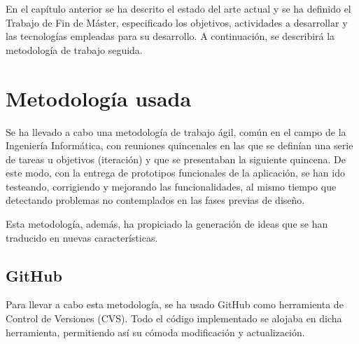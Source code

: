 

En el capítulo anterior se ha descrito el estado del arte actual y se ha definido el Trabajo de Fin de Máster, especificado los objetivos, actividades a desarrollar y las tecnologías empleadas para su desarrollo. A continuación, se describirá la metodología de trabajo seguida.


\section{Metodología usada}
\label{2:sec:1}

Se ha llevado a cabo una metodología de trabajo ágil, común en el campo de la Ingeniería Informática, con reuniones quincenales en las que se definían una serie de tareas u objetivos (iteración) y que se presentaban la siguiente quincena. 
De este modo, con la entrega de prototipos funcionales de la aplicación, se han ido testeando, corrigiendo y mejorando las 
funcionalidades, al mismo tiempo que detectando problemas no contemplados en las fases previas de diseño.

Esta metodología, además, ha propiciado la generación de ideas que se han traducido en nuevas características.


\subsection{GitHub}
\label{subsec:2.1.1}

Para llevar a cabo esta metodología, se ha usado GitHub como herramienta de Control de Versiones (CVS).
Todo el código implementado se alojaba en dicha herramienta, permitiendo así su cómoda modificación y actualización.

